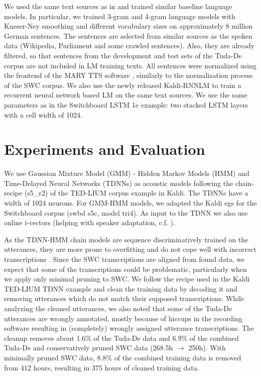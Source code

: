 \documentclass[a4paper]{article}
\begin{document}
We used the same text sources as in \cite{radeck2015open} and trained similar baseline language models. In particular, we trained 3-gram and 4-gram language models with Kneser-Ney smoothing \cite{kneser1995improved} and different vocabulary sizes on approximately 8 million German sentences. The sentences are selected from similar sources as the spoken data (Wikipedia, Parliament and some crawled sentences). Also, they are already filtered, so that sentences from the development and test sets of the Tuda-De corpus are not included in LM training texts. All sentences were normalized using the frontend of the MARY TTS software \cite{schroder2003german}, similarly to the normalization process of the SWC corpus.
We also use the newly released Kaldi-RNNLM \cite{xu2018neural} to train a recurrent neural network based LM on the same text sources. We use the same parameters as in the Switchboard LSTM 1e example: two stacked LSTM layers with a cell width of 1024.


\section{Experiments and Evaluation}
\label{sec:experiments}




We use Gaussian Mixture Model (GMM) - Hidden Markov Models (HMM) and Time-Delayed Neural Networks (TDNNs) \cite{waibel1990phoneme, peddinti2015time} as acoustic models following the chain-recipe (s5\_r2) of the TED-LIUM corpus \cite{rousseau2014enhancing} example in Kaldi. The TDNNs have a width of 1024 neurons. For GMM-HMM models, we adapted the Kaldi egs for the Switchboard corpus (swbd s5c, model tri4). As input to the TDNN we also use online i-vectors (helping with speaker adaptation, c.f. \cite{saon2013speaker, senior2014improving, miao2015speaker}). 

As the TDNN-HMM chain models are sequence discriminatively trained on the utterances, they are more prone to overfitting and do not cope well with incorrect transcriptions \cite{povey2016purely}. Since the SWC transcriptions are aligned from found data, we expect that some of the transcriptions could be problematic, particularly when we apply only minimal pruning to SWC. We follow the recipe used in the Kaldi TED-LIUM TDNN example and clean the training data by decoding it and removing utterances which do not match their supposed transcriptions. While analyzing the cleaned utterances, we also noted that some of the Tuda-De utterances are wrongly annotated, mostly because of hiccups in the recording software \cite{schnelle2014open} resulting in (completely) wrongly assigned utterance transcriptions. The cleanup removes about 1.6\% of the Tuda-De data and 6.9\% of the combined Tuda-De and conservatively pruned SWC data (268.5h $\rightarrow$ 250h). With minimally pruned SWC data, 8.8\% of the combined training data is removed from 412 hours, resulting in 375 hours of cleaned training data.
\end{document}
